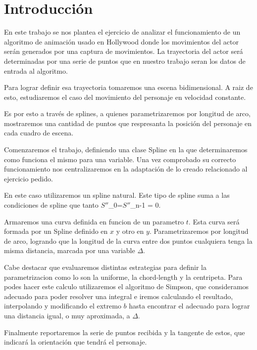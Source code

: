 \section{Introducción}

\hspace*{0.5cm}En este trabajo se nos plantea el ejercicio de analizar el funcionamiento de un algoritmo de animación usado en Hollywood donde
los movimientos del actor serán generados por una captura de movimientos. La trayectoria del actor será determinadas por
una serie de puntos que en nuestro trabajo seran los datos de entrada al algoritmo.

Para lograr definir esa trayectoria tomaremos una escena bidimensional. A raiz de esto, estudiaremos el caso del movimiento del personaje en velocidad constante.

Es por esto a través de splines, a quienes parametrizaremos por longitud de arco, mostraremos una cantidad de puntos que respresanta la posición del personaje en cada cuadro de escena.
 
Comenzaremos el trabajo, definiendo una clase Spline en la que determinaremos como funciona el mismo para una variable. Una vez comprobado su correcto funcionamiento nos centralizaremos en la adaptación de lo creado relacionado al ejercicio pedido.

En este caso utilizaremos un spline natural. Este tipo de spline suma a las condiciones de spline que tanto $S''$_0=$S''$_{n-1} = 0.

Armaremos una curva definida en funcion de un parametro $t$. Esta curva será formada por un Spline definido en $x$ y otro en $y$. Parametrizaremos por longitud de arco, logrando que la longitud de la curva entre dos puntos cualquiera tenga la misma distancia, marcada por una variable $\Delta$.

Cabe destacar que evaluaremos distintas estrategias para definir la parametrizacion como lo son la uniforme, la chord-length y la centripeta. 
Para podes hacer este calculo utilizaremos el algoritmo de Simpson, que consideramos adecuado para poder resolver una integral e iremos calculando el resultado, interpolando y modificando el extremo $b$ hasta encontrar el adecuado para lograr una distancia igual, o muy aproximada, a $\Delta$.

Finalmente reportaremos la serie de puntos recibida y la tangente de estos, que indicará la orientación que tendrá el personaje.
